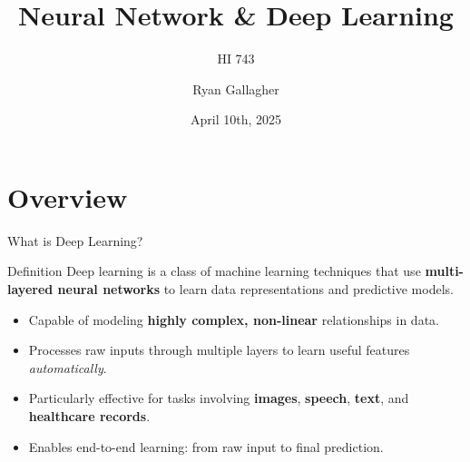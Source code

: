 \documentclass[aspectratio=169,xcolor=dvipsnames]{beamer}
\title{Neural Network \& Deep Learning}
\subtitle{HI 743}
\author{Ryan Gallagher}
\institute
{
    Department of Health Informatics and Administration \\
    Zilber College of Public Health \\
    University of Wisconsin - Milwaukee%
}
\date{April 10th, 2025} %
\begin{document}
\begin{frame}
    \titlepage
\end{frame}




\section{Overview}

\begin{frame}{What is Deep Learning?}
  \begin{block}{Definition}
    Deep learning is a class of machine learning techniques that use \textbf{multi-layered neural networks} to learn data representations and predictive models.
  \end{block}

  \vspace{0.5em}

  \begin{itemize}
    \item Capable of modeling \textbf{highly complex, non-linear} relationships in data.
    \item Processes raw inputs through multiple layers to learn useful features \textit{automatically}.
    \item Particularly effective for tasks involving \textbf{images}, \textbf{speech}, \textbf{text}, and \textbf{healthcare records}.
    \item Enables end-to-end learning: from raw input to final prediction.
  \end{itemize}
\end{frame}
\end{document}
